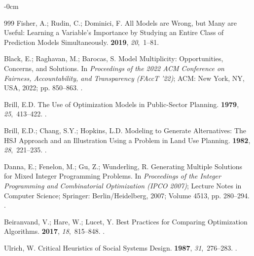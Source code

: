 \documentclass[systems,article,accept,moreauthors,pdftex]{Definitions/mdpi}
\begin{document}
\begin{adjustwidth}{-\extralength}{0cm}
\begin{thebibliography}{999}
Fisher, A.; Rudin, C.; Dominici, F.
\newblock All Models are Wrong, but Many are Useful: Learning a Variable's
  Importance by Studying an Entire Class of Prediction Models Simultaneously.
 {\bf 2019}, {\em
  20},~1--81.

Black, E.; Raghavan, M.; Barocas, S.
\newblock Model Multiplicity: Opportunities, Concerns, and Solutions.
\newblock In \emph{Proceedings of the 2022 ACM Conference on
  Fairness, Accountability, and Transparency (FAccT '22)}; ACM: New York, NY, USA,
  2022; pp. 850--863.
.

Brill, E.D.
\newblock The Use of Optimization Models in Public-Sector Planning.
 {\bf 1979}, {\em 25},~413--422.
.

Brill, E.D.; Chang, S.Y.; Hopkins, L.D.
\newblock Modeling to Generate Alternatives: The {HSJ} Approach and an
  Illustration Using a Problem in Land Use Planning.
 {\bf 1982}, {\em 28},~221--235.
.

Danna, E.; Fenelon, M.; Gu, Z.; Wunderling, R.
\newblock Generating Multiple Solutions for Mixed Integer Programming Problems.
\newblock In \emph{Proceedings of the Integer Programming and Combinatorial
  Optimization (IPCO 2007)}; Lecture   Notes in Computer Science; Springer: Berlin/Heidelberg,  2007; Volume 4513, pp. 280--294.
.

Beiranvand, V.; Hare, W.; Lucet, Y.
\newblock Best Practices for Comparing Optimization Algorithms.
 {\bf 2017}, {\em 18},~815--848.
.

Ulrich, W.
\newblock Critical Heuristics of Social Systems Design.
 {\bf 1987}, {\em
  31},~276--283.
.


\end{thebibliography}
\end{adjustwidth}
\end{document}
